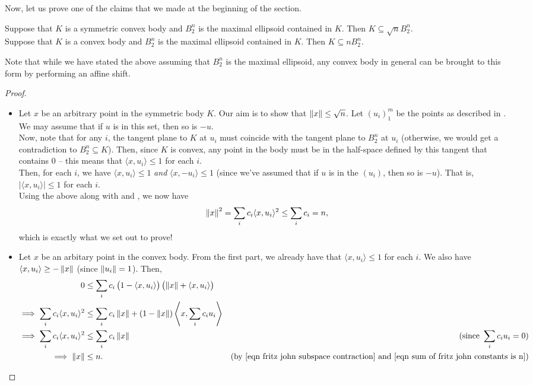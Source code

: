Now, let us prove one of the claims that we made at the beginning of the section.

\begin{ftheo}
\label{fritz john banach mazur distance}
Suppose that $K$ is a symmetric convex body and $B_2^n$ is the maximal ellipsoid contained in $K$. Then $K\subseteq\sqrt{n} B_2^n$.\\
Suppose that $K$ is a convex body and $B_2^n$ is the maximal ellipsoid contained in $K$. Then $K\subseteq n B_2^n$.
\end{ftheo}
Note that while we have stated the above assuming that $B_2^n$ is the maximal ellipsoid, any convex body in general can be brought to this form by performing an affine shift.
\begin{proof}
\phantom{agh}
\begin{itemize}
    \item Let $x$ be an arbitrary point in the symmetric body $K$. Our aim is to show that $\left\lVert x\right\rVert\leq\sqrt{n}$. Let $(u_i)_1^m$ be the points as described in . We may assume that if $u$ is in this set, then so is $-u$.\\
    Now, note that for any $i$, the tangent plane to $K$ at $u_i$ must coincide with the tangent plane to $B_2^n$ at $u_i$ (otherwise, we would get a contradiction to $B_2^n\subseteq K$). Then, since $K$ is convex, any point in the body must be in the half-space defined by this tangent that contains $0$ -- this means that $\langle x,u_i\rangle \leq 1$ for each $i$.\\
    Then, for each $i$, we have $\langle x,u_i\rangle \leq 1$ \textit{and} $\langle x,-u_i\rangle\leq 1$ (since we've assumed that if $u$ is in the $(u_i)$, then so is $-u$). That is, $|\langle x,u_i\rangle|\leq 1$ for each $i$.\\
    Using the above along with  and , we now have
    \[ \left\lVert x\right\rVert^2 = \sum_i c_i\langle x,u_i\rangle^2 \leq \sum_i c_i = n, \]
    which is exactly what we set out to prove!
    
    \item Let $x$ be an arbitary point in the convex body. From the first part, we already have that $\langle x,u_i\rangle \leq 1$ for each $i$. We also have $\langle x,u_i\rangle \geq -\left\lVert x\right\rVert$ (since $\left\lVert u_i\right\rVert=1$). Then,
    \begin{align*}
        0 &\leq \sum_i c_i\left(1 - \langle x,u_i\rangle\right)\left( \norm{x} + \langle x,u_i\rangle\right) \\
        \implies \sum_i c_i\langle x,u_i\rangle^2 &\leq \sum_i c_i \norm{x} + (1-\norm{x})\left\langle x,\sum_i c_i u_i \right\rangle \\
        \implies \sum_i c_i\langle x,u_i\rangle^2 &\leq \sum_i c_i \norm{x} & (\text{since }\sum_i c_i u_i = 0) \\
        \implies \norm{x} &\leq n. & (\text{by \Cref{eqn fritz john subspace contraction} and \Cref{eqn sum of fritz john constants is n}})
    \end{align*}
\end{itemize}
\end{proof}

